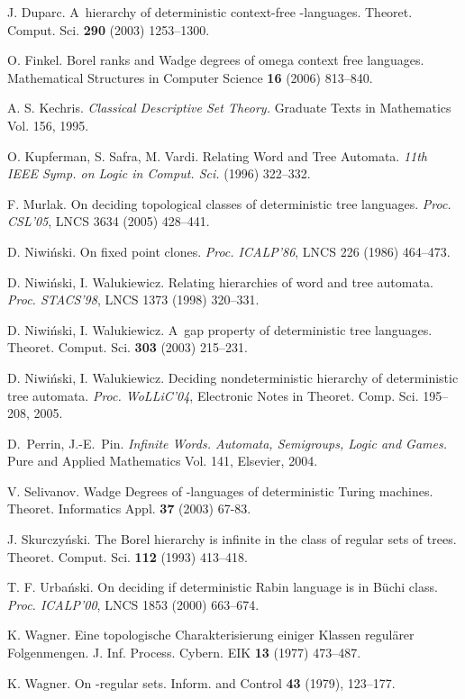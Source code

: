 \documentclass{LMCS}
\begin{document}
\begin{thebibliography}{99}

 J. Duparc. 
  A~hierarchy of deterministic context-free -languages.
   Theoret. Comput. Sci. {\bfseries 290} (2003) 1253--1300.

 O. Finkel. 
  Borel ranks and Wadge degrees of omega context free languages. 
  Mathematical Structures in Computer Science {\bfseries 16} (2006) 813--840.

 A. S. Kechris.
  \textit{Classical Descriptive Set Theory.}
  Graduate Texts in Mathematics Vol. 156, 1995.

 O. Kupferman, S. Safra, M. Vardi.
  Relating Word and Tree Automata. 
  \textit{11th IEEE Symp. on Logic in Comput. Sci.} (1996) 322--332.

 F. Murlak.
  On deciding topological classes of deterministic tree languages.
  \textit{Proc. CSL'05}, LNCS 3634 (2005) 428--441. 

 D. Niwi\'nski.
  On fixed point clones.
  \textit{Proc. ICALP'86}, LNCS 226 (1986) 464--473.

 D. Niwi\'nski, I. Walukiewicz.
  Relating hierarchies of word and tree automata.
  \textit{Proc. STACS'98}, LNCS 1373 (1998) 320--331.

 D. Niwi\'nski, I. Walukiewicz.
  A~gap property of deterministic tree languages.
  Theoret. Comput. Sci. {\bfseries 303} (2003) 215--231.

 D. Niwi\'nski, I. Walukiewicz.
  Deciding nondeterministic hierarchy  of deterministic tree automata.
  \textit{Proc. WoLLiC'04}, Electronic Notes in Theoret. Comp. Sci. 195--208, 2005.

 D.~Perrin, J.-E.~Pin.
  \textit{Infinite Words. Automata, Semigroups, Logic and Games.}
  Pure and Applied Mathematics Vol. 141, Elsevier, 2004.

 V. Selivanov. 
  Wadge Degrees of -languages of deterministic Turing machines.
  Theoret. Informatics Appl. {\bfseries 37} (2003) 67-83.

 J. Skurczy\'nski.
  The Borel hierarchy is infinite in the class of regular sets of trees.
  Theoret. Comput. Sci. {\bfseries 112} (1993) 413--418.

 T. F. Urba\'nski.
  On deciding if deterministic Rabin language is in B\"uchi class.
  \textit{Proc. ICALP'00}, LNCS 1853 (2000) 663--674.

 K. Wagner.
  Eine topologische Charakterisierung einiger Klassen regul\"arer Folgenmengen.
  J. Inf. Process. Cybern. EIK {\bfseries 13} (1977) 473--487.

 K. Wagner. 
  On -regular sets. 
  Inform. and Control {\bfseries 43} (1979), 123--177.

\end{thebibliography}
\end{document}
